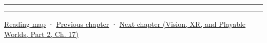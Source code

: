\begin{center}\rule{0.5\linewidth}{0.5pt}\end{center}

\begin{center}\rule{0.5\linewidth}{0.5pt}\end{center}

\hyperref[volume-reading-map]{Reading map} · \hyperref[06-engine-ii-ch044-cross-backend-conversion-and-agreement]{Previous chapter} · \href{../07-Vision-XR-and-Playable-Worlds-P02/main.pdf\#nameddest=06-engine-ii-ch046-game-design-from-mechanics-to-narrative-interfaces}{Next chapter (Vision, XR, and Playable Worlds, Part 2, Ch. 17)}
